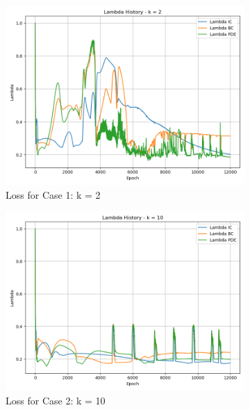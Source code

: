 \documentclass[11pt]{article}
\begin{document}
\begin{figure}[h!]
    \centering
    \begin{subfigure}[b]{0.48\textwidth}
        \includegraphics[width=\textwidth]{2D_Lambda_K1_Rowdy.png}
        \caption{Loss for Case 1: k = 2}
        \label{fig:Lambda_K1_Rowdy}
    \end{subfigure}
    \hfill
    \begin{subfigure}[b]{0.48\textwidth}
        \includegraphics[width=\textwidth]{2D_Lambda_K2_Rowdy.png}
        \caption{Loss for Case 2: k = 10}
        \label{fig:Lambda_K2_Rowdy}
    \end{subfigure}
    \hfill
    \begin{subfigure}[b]{0.48\textwidth}

\end{subfigure}
\end{figure}
\end{document}
